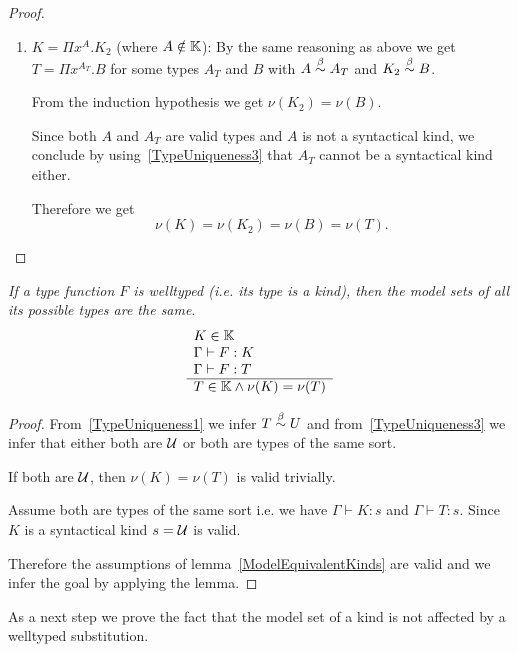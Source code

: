 \begin{lemma}
\begin{proof}
\begin{enumerate}
        \item $K = \Pi x^A . K_2$ (where $A \notin \mathbb{K}$):
            By the same reasoning as above we get $T = \Pi x^{A_T}.B$ for some
            types $A_T$ and $B$ with $A \stackrel{\beta}{\sim} A_T$ and $ K_2 \stackrel{\beta}{\sim} B$.

                From the induction hypothesis we get $\nu(K_2) = \nu(B)$.

            Since both $A$ and $A_T$ are valid types and $A$ is not a
                syntactical kind, we conclude by using~\ref{TypeUniqueness3}
                that $A_T$ cannot be a syntactical kind either.

            Therefore we get
            $$
                \nu(K) = \nu(K_2) = \nu(B) = \nu(T).
            $$
        \end{enumerate}
    \end{proof}
\end{lemma}


\begin{theorem}
    \label{ModelAllTypesSame}
    \emph{If a type function $F$ is welltyped (i.e. its type is a kind), then
    the model sets of all its possible types are the same}.
    $$
    \begin{array}{l} 
        K \in \mathbb{K}
        \\
        \Gamma \vdash F: K
        \\
        \Gamma \vdash F: T
     \\ \hline 
        T \in \mathbb{K} \land \nu(K) = \nu(T)
    \end{array}
    $$

    \begin{proof}
        From~\ref{TypeUniqueness1} we infer $T \stackrel{\beta}{\sim} U$ and
        from~\ref{TypeUniqueness3} we infer that either both are ${\cal U}$ or both
        are types of the same sort.

        If both are ${\cal U}$, then $\nu(K) = \nu(T)$ is valid trivially.

        Assume both are types of the same sort i.e. we have $\Gamma \vdash K: s$
        and $\Gamma \vdash T: s$. Since $K$ is a syntactical kind $s = {\cal U}$ is
        valid.

        Therefore the assumptions of lemma~\ref{ModelEquivalentKinds} are valid
        and we infer the goal by applying the lemma.
    \end{proof}
\end{theorem}



As a next step we prove the fact that the model set of a kind is not affected by
a welltyped substitution.


